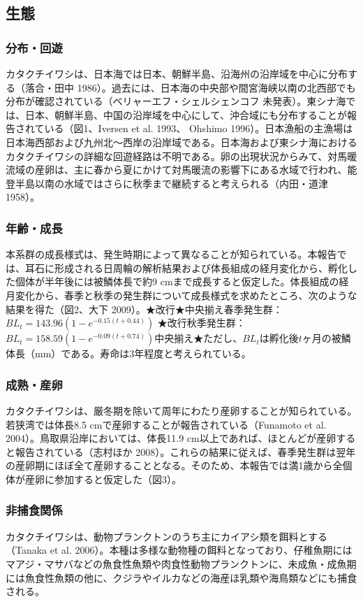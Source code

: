 \subsection{生態}
\subsubsection{分布・回遊}
カタクチイワシは、日本海では日本、朝鮮半島、沿海州の沿岸域を中心に分布する（落合・田中 1986）。過去には、日本海の中央部や間宮海峡以南の北西部でも分布が確認されている（ベリャーエフ・シェルシェンコフ 未発表）。東シナ海では、日本、朝鮮半島、中国の沿岸域を中心にして、沖合域にも分布することが報告されている（図1、Iversen et al. 1993、 Ohshimo 1996）。日本漁船の主漁場は日本海西部および九州北～西岸の沿岸域である。日本海および東シナ海におけるカタクチイワシの詳細な回遊経路は不明である。卵の出現状況からみて、対馬暖流域の産卵は、主に春から夏にかけて対馬暖流の影響下にある水域で行われ、能登半島以南の水域ではさらに秋季まで継続すると考えられる（内田・道津 1958）。
\subsubsection{年齢・成長}
本系群の成長様式は、発生時期によって異なることが知られている。本報告では、耳石に形成される日周輪の解析結果および体長組成の経月変化から、孵化した個体が半年後には被鱗体長で約9 cmまで成長すると仮定した。体長組成の経月変化から、春季と秋季の発生群について成長様式を求めたところ、次のような結果を得た（図2、大下 2009）。★改行★中央揃え春季発生群： $BL_t = 143.96(1-e^{-0.15(t+0.44)})$ ★改行秋季発生群： $BL_t = 158.59(1-e^{-0.09(t+0.74)})$中央揃え★ただし、$BL_t$は孵化後$t$ヶ月の被鱗体長（mm）である。寿命は3年程度と考えられている。
\subsubsection{成熟・産卵}
カタクチイワシは、厳冬期を除いて周年にわたり産卵することが知られている。若狭湾では体長8.5 cmで産卵することが報告されている（Funamoto et al. 2004）。鳥取県沿岸においては、体長11.9 cm以上であれば、ほとんどが産卵すると報告されている（志村ほか 2008）。これらの結果に従えば、春季発生群は翌年の産卵期にほぼ全て産卵することとなる。そのため、本報告では満1歳から全個体が産卵に参加すると仮定した（図3）。
\subsubsection{非捕食関係}
カタクチイワシは、動物プランクトンのうち主にカイアシ類を餌料とする（Tanaka et al. 2006）。本種は多様な動物種の餌料となっており、仔稚魚期にはマアジ・マサバなどの魚食性魚類や肉食性動物プランクトンに、未成魚・成魚期には魚食性魚類の他に、クジラやイルカなどの海産ほ乳類や海鳥類などにも捕食される。


